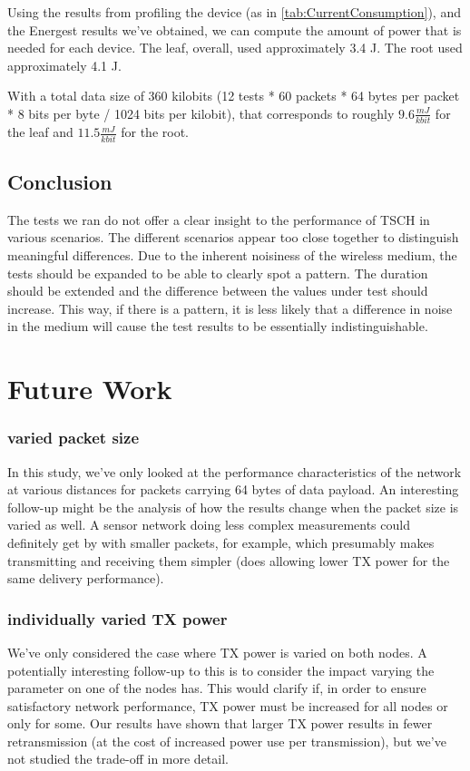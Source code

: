 \documentclass[conference]{IEEEtran}
\begin{document}
Using the results from profiling the device (as in \ref{tab:CurrentConsumption}), and the Energest results we've obtained, we can compute the amount of power that is needed for each device. The leaf, overall, used approximately 3.4 J. The root used approximately 4.1 J.

With a total data size of 360 kilobits (12 tests * 60 packets * 64 bytes per packet * 8 bits per byte / 1024 bits per kilobit), that corresponds to roughly $9.6 \frac{mJ}{kbit}$ for the leaf and $11.5 \frac{mJ}{kbit}$ for the root.


\subsection{Conclusion}

The tests we ran do not offer a clear insight to the performance of TSCH in various scenarios. The different scenarios appear too close together to distinguish meaningful differences. Due to the inherent noisiness of the wireless medium, the tests should be expanded to be able to clearly spot a pattern. The duration should be extended and the difference between the values under test should increase. This way, if there is a pattern, it is less likely that a difference in noise in the medium will cause the test results to be essentially indistinguishable. 

\section{Future Work}

\subsubsection{varied packet size}
In this study, we've only looked at the performance characteristics of the network at various distances for packets carrying 64 bytes of data payload. An interesting follow-up might be the analysis of how the results change when the packet size is varied as well. A sensor network doing less complex measurements could definitely get by with smaller packets, for example, which presumably makes transmitting and receiving them simpler (does allowing lower TX power for the same delivery performance). 

\subsubsection{individually varied TX power}
We've only considered the case where TX power is varied on both nodes. A potentially interesting follow-up to this is to consider the impact varying the parameter on one of the nodes has. This would clarify if, in order to ensure satisfactory network performance, TX power must be increased for all nodes or only for some. Our results have shown that larger TX power results in fewer retransmission (at the cost of increased power use per transmission), but we've not studied the trade-off in more detail.
\end{document}
